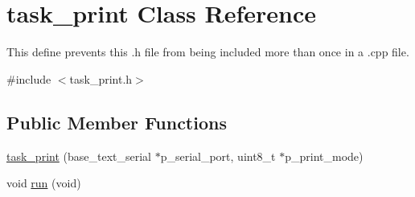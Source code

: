 \hypertarget{classtask__print}{\section{task\-\_\-print Class Reference}
\label{classtask__print}
}


This define prevents this .h file from being included more than once in a .cpp file.  




{\ttfamily \#include $<$task\-\_\-print.\-h$>$}

\subsection*{Public Member Functions}
\begin{DoxyCompactItemize}
\item 
\hyperlink{classtask__print_a40c98a0ed4664ffe410da702ea0d3311}{task\-\_\-print} (base\-\_\-text\-\_\-serial $\ast$p\-\_\-serial\-\_\-port, uint8\-\_\-t $\ast$p\-\_\-print\-\_\-mode)
\item 
void \hyperlink{classtask__print_a568efc42203ca707a55ec464c6f420b9}{run} (void)
\end{DoxyCompactItemize}
